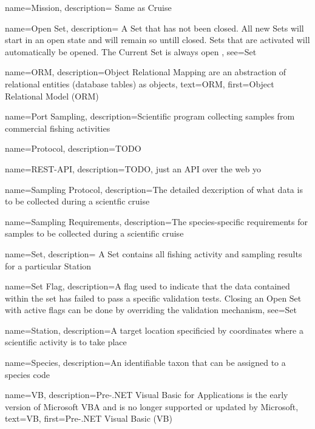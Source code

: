  {
  name=Mission,
  description={
    Same as \gls{Cruise}
  }
}

 {
  name=Open Set,
  description={
    A \gls{Set} that has not been closed. All new Sets will start in an open state and will remain so untill closed.
    Sets that are activated will automatically be opened.
    The \gls{Current Set} is always open
  },
  see={Set}
}

 {
  name=ORM,
  description={Object Relational Mapping are an abstraction of relational entities (database tables) as objects},
  text={ORM},
  first={Object Relational Model (ORM)}
}

 {
  name=Port Sampling,
  description={Scientific program collecting samples from commercial fishing activities}
}

 {
  name=Protocol,
  description={TODO}
}

 {
  name=REST-API,
  description={TODO, just an API over the web yo}
}

 {
  name=Sampling Protocol,
  description={The detailed dexcription of what data is to be collected during a scientfic cruise}
}

 {
  name=Sampling Requirements,
  description={The species-specific requirements for samples to be collected during a scientific cruise}
}

 {
  name=Set,
  description={
    A Set contains all fishing activity and sampling results for a particular \gls{Station}
  }
}

 {
  name=Set Flag,
  description={A flag used to indicate that the data contained within the set has failed to pass a specific validation tests.
  Closing an \gls{Open Set} with active flags can be done by overriding the validation mechanism},
  see=\gls{Set}
  }

 {
  name=Station,
  description={A target location specificied by coordinates where a scientific activity is to take place}
}

 {
  name=Species,
  description={An identifiable taxon that can be assigned to a species code}
}

 {
  name=VB,
  description={Pre-.NET Visual Basic for Applications is the early version of Microsoft VBA and is no longer supported or updated by Microsoft},
  text={VB},
  first={Pre-.NET Visual Basic (VB)}
}

